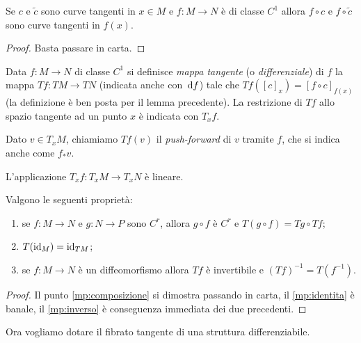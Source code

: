 \begin{lemma}
	Se $c$ e $\tilde{c}$ sono curve tangenti in $x\in M$ e $f:M\to N$ è di classe $C^1$ allora $f\circ c$ e $f\circ\tilde{c}$ sono curve tangenti in $f(x)$.
\end{lemma}

 \begin{proof}
  Basta passare in carta.
 \end{proof}

\begin{definition}  
	Data $f:M\to N$ di classe $C^1$ si definisce \emph{mappa tangente} (o \emph{differenziale}) di $f$ la mappa $Tf:TM\to TN$ (indicata anche con $\,\mathrm d f$) tale che $Tf([c]_x)=[f\circ c]_{f(x)}$ (la definizione è ben posta per il lemma precedente).
	La restrizione di $Tf$ allo spazio tangente ad un punto $x$ è indicata con $T_xf$.
\end{definition}

\begin{remark}
	Dato $v\in T_xM$, chiamiamo $Tf(v)$ il \emph{push-forward} di $v$ tramite $f$, che si indica anche come $f_*v$. 
\end{remark}


\begin{remark}
	L'applicazione $T_xf:T_xM\to T_xN$ è lineare.
\end{remark}
 
\begin{theorem} \label{thm:MappeComposte} 
	Valgono le seguenti proprietà:
	\begin{enumerate}
	\item se $f:M\to N$ e $g:N\to P$ sono $C^r$, allora $g\circ f$ è $C^r$ e $T(g\circ f)=Tg\circ Tf$; \label{mp:composizione}
	\item $T(\mathrm{id}_M)=\mathrm{id}_{TM}$; \label{mp:identita}
	\item se $f:M\to N$ è un diffeomorfismo allora $Tf$ è invertibile e $(Tf)^{-1}=T(f^{-1})$. \label{mp:inverso}
	\end{enumerate}
\end{theorem}

\begin{proof}
	Il punto \ref{mp:composizione} si dimostra passando in carta, il \ref{mp:identita} è banale, il \ref{mp:inverso} è conseguenza immediata dei due precedenti.
\end{proof}

Ora vogliamo dotare il fibrato tangente di una struttura differenziabile.
 
